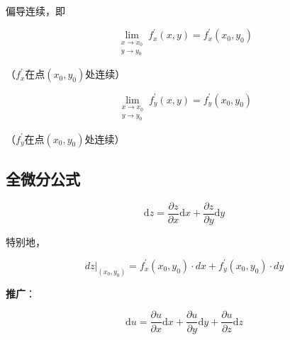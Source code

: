 \documentclass[12pt, a4paper]{article}
\numberwithin{equation}{section}
\newcommand{\rmd}{\mathrm{d}}
\begin{document}
    偏导连续，即

    $$
        \lim _{\substack{x \rightarrow x_0 \\ y \rightarrow y_0}} f_x^{\prime}(x, y)=f_x^{\prime}\left(x_0, y_0\right)
    $$

    （\(f_x^{\prime}\)在点\(\left(x_0, y_0\right)\)处连续）

    $$
        \lim _{\substack{x \rightarrow x_0 \\ y \rightarrow y_0}} f_y^{\prime}(x, y)=f_y^{\prime}\left(x_0, y_0\right)
    $$

    （\(f_y^{\prime}\)在点\(\left(x_0, y_0\right)\)处连续）

\subsection{全微分公式}

    \begin{equation}
        \rmd z=\frac{\partial z}{\partial x} \rmd x+\frac{\partial z}{\partial y} \rmd y
    \end{equation}

    特别地，

    \begin{equation}
        \left.d z\right|_{\left(x_0, y_0\right)}=
        f_x^{\prime}\left(x_0, y_0\right) \cdot d x+f_y^{\prime}\left(x_0, y_0\right) \cdot d y
    \end{equation}

    \textbf{推广}：

    \begin{equation}
        \rmd u=\frac{\partial u}{\partial x} \rmd x+\frac{\partial u}{\partial y} \rmd y+\frac{\partial u}{\partial z} \rmd z
    \end{equation}
\end{document}

